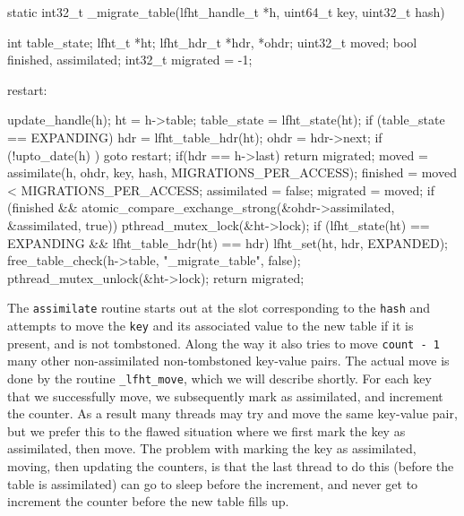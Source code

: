 \begin{center}
\begin{clisting}
static int32_t _migrate_table(lfht_handle_t *h, uint64_t key, uint32_t hash){
  int table_state;
  lfht_t *ht;
  lfht_hdr_t *hdr, *ohdr;
  uint32_t moved;
  bool finished, assimilated;
  int32_t migrated = -1;
  
 restart:

  update_handle(h);
  ht = h->table;
  table_state = lfht_state(ht);
  if (table_state == EXPANDING){
    hdr = lfht_table_hdr(ht);
    ohdr = hdr->next;
    if (!upto_date(h) ){ goto restart; }
    if(hdr == h->last){ return migrated; }
    moved = assimilate(h, ohdr, key, hash,  MIGRATIONS_PER_ACCESS);
    finished = moved < MIGRATIONS_PER_ACCESS;
    assimilated = false;
    migrated = moved;
    if (finished  &&  atomic_compare_exchange_strong(&ohdr->assimilated, &assimilated, true)){
      pthread_mutex_lock(&ht->lock);
      if (lfht_state(ht) == EXPANDING  && lfht_table_hdr(ht) == hdr){
	lfht_set(ht, hdr, EXPANDED);
        free_table_check(h->table, "_migrate_table", false);
      }
      pthread_mutex_unlock(&ht->lock);
    }
  }
  return migrated;
}
\end{clisting}
\end{center}

The \texttt{assimilate} routine starts out at the slot corresponding to the \texttt{hash} and attempts to
move the \texttt{key} and its associated value to the new table if it is present, and is not tombstoned. Along the way it also tries to
move \texttt{count - 1} many other non-assimilated non-tombstoned key-value pairs. The actual move is done by the routine \texttt{\_lfht\_move},
which we will describe shortly.  For each key that we successfully move, we subsequently mark as assimilated, and increment the counter.
As a result many threads may try and
move the same key-value pair, but we prefer this to the flawed situation where we first mark the key as assimilated, then
move.  The problem with marking the key as assimilated, moving, then updating the counters, is that the last thread to do this (before the
table is assimilated) can go to sleep before the increment, and never get to increment the counter before the new table fills up.


